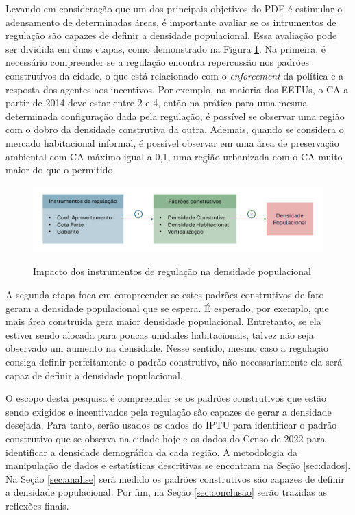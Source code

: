 Levando em consideração que um dos principais objetivos do PDE é estimular o adensamento de determinadas áreas, é importante avaliar se os intrumentos de regulação são capazes de definir a densidade populacional. Essa avaliação pode ser dividida em duas etapas, como demonstrado na Figura \ref{fig:proposta}. Na primeira, é necessário compreender se a regulação encontra repercussão nos padrões construtivos da cidade, o que está relacionado com o \textit{enforcement} da política e a resposta dos agentes aos incentivos. Por exemplo, na maioria dos EETUs, o CA a partir de 2014 deve estar entre 2 e 4, então na prática para uma mesma determinada configuração dada pela regulação, é possível se observar uma região com o dobro da densidade construtiva da outra. Ademais, quando se considera o mercado habitacional informal, é possível observar em uma área de preservação ambiental com CA máximo igual a 0,1, uma região urbanizada com o CA muito maior do que o permitido.

\begin{figure}[h]
    \centering
    \caption{Impacto dos instrumentos de regulação na densidade populacional}
    \includegraphics[width = \linewidth]{imagens/desenho_proposta.pdf}
    \label{fig:proposta}
\end{figure}

A segunda etapa foca em compreender se estes padrões construtivos de fato geram a densidade populacional que se espera. É esperado, por exemplo, que mais área construída gera maior densidade populacional. Entretanto, se ela estiver sendo alocada para poucas unidades habitacionais, talvez não seja observado um aumento na densidade. Nesse sentido, mesmo caso a regulação consiga definir perfeitamente o padrão construtivo, não necessariamente ela será capaz de definir a densidade populacional.

O escopo desta pesquisa é compreender se os padrões construtivos que estão sendo exigidos e incentivados pela regulação são capazes de gerar a densidade desejada. Para tanto, serão usados os dados do IPTU para identificar o padrão construtivo que se observa na cidade hoje e os dados do Censo de 2022 para identificar a densidade demográfica da cada região. A metodologia da manipulação de dados e estatísticas descritivas se encontram na Seção \ref{sec:dados}. Na Seção \ref{sec:analise} será medido os padrões construtivos são capazes de definir a densidade populacional. Por fim, na Seção \ref{sec:conclusao} serão trazidas as reflexões finais.


